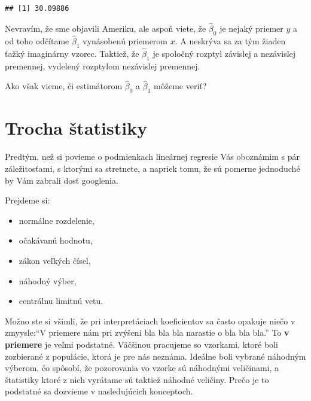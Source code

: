 \begin{verbatim}
## [1] 30.09886
\end{verbatim}

\begin{Shaded}
\begin{Highlighting}[]
\end{Highlighting}
\end{Shaded}

Nevravím, že sme objavili Ameriku, ale aspoň viete, že \(\hat\beta_0\)
je nejaký priemer \(y\) a od toho odčítame \(\hat\beta_1\) vynásobenú
priemerom \(x\). A neskrýva sa za tým žiaden ťažký imaginárny vzorec.
Taktiež, že \(\hat\beta_1\) je spoločný rozptyl závislej a nezávislej
premennej, vydelený rozptylom nezávislej premennej.

Ako však vieme, či estimátorom \(\hat\beta_0\) a \(\hat\beta_1\) môžeme
veriť?

\newpage

\hypertarget{trocha-ux161tatistiky}{%
\section{Trocha štatistiky}\label{trocha-ux161tatistiky}}

Predtým, než si povieme o podmienkach lineárnej regresie Vás oboznámim s
pár záležitosťami, s ktorými sa stretnete, a napriek tomu, že sú pomerne
jednoduché by Vám zabrali dosť googlenia.

Prejdeme si:

\begin{itemize}
\tightlist
\item
  normálne rozdelenie,
\item
  očakávanú hodnotu,
\item
  zákon veľkých čísel,
\item
  náhodný výber,
\item
  centrálnu limitnú vetu.
\end{itemize}

Možno ste si všimli, že pri interpretáciach koeficientov sa často
opakuje niečo v zmyysle:``V priemere nám pri zvýšeni bla bla bla
narastie o bla bla bla.'' To \textbf{v priemere} je veľmi podstatné.
Väčšinou pracujeme so vzorkami, ktoré boli zozbierané z populácie, ktorá
je pre nás neznáma. Ideálne boli vybrané náhodným výberom, čo spôsobí,
že pozorovania vo vzorke sú náhodnými veličinami, a štatistiky ktoré z
nich vyrátame sú taktiež náhodné veličiny. Prečo je to podstatné sa
dozvieme v nasledujúcich konceptoch.

